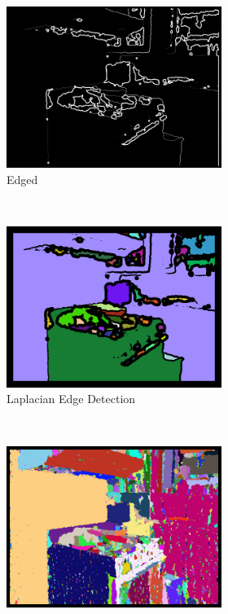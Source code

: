 \begin{figure}[t]
\vspace{.1in}

\begin{subfigure}{\textwidth}
    \centering
    \begin{subfigure}[t]{0.33\textwidth}
        \centering
        \includegraphics[height=.6\textwidth]{figs/Edged321.png}
        \caption{Edged}
        \label{fig:results:edged}
    \end{subfigure}%
    ~ 
    \begin{subfigure}[t]{0.33\textwidth}
        \centering
        \includegraphics[height=.6\textwidth]{figs/Laplacian321.png}
        \caption{Laplacian Edge Detection}
        \label{fig:results:laplacian}
    \end{subfigure}%
    ~ 
    \begin{subfigure}[t]{0.33\textwidth}
        \centering
        \includegraphics[height=.6\textwidth]{figs/Gradient321.png}

\end{subfigure}
\end{subfigure}
\end{figure}
